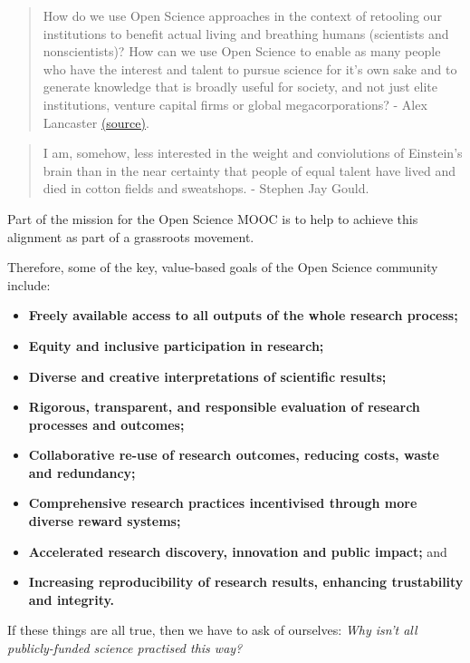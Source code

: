 \documentclass[]{book}
\begin{document}
{{\begin{quote}
How do we use Open Science approaches in the context of retooling our institutions to benefit actual living and breathing humans (scientists and nonscientists)? How can we use Open Science to enable as many people who have the interest and talent to pursue science for it's own sake and to generate knowledge that is broadly useful for society, and not just elite institutions, venture capital firms or global megacorporations? - Alex Lancaster \href{http://ronininstitute.org/open-science-and-its-discontents/}{(source)}.
\end{quote}

\begin{quote}
I am, somehow, less interested in the weight and conviolutions of Einstein's brain than in the near certainty that people of equal talent have lived and died in cotton fields and sweatshops. - Stephen Jay Gould.
\end{quote}

Part of the mission for the Open Science MOOC is to help to achieve this alignment as part of a grassroots movement.

Therefore, some of the key, value-based goals of the Open Science community include:

\begin{itemize}
\item
  \textbf{Freely available access to all outputs of the whole research process;}
\item
  \textbf{Equity and inclusive participation in research;}
\item
  \textbf{Diverse and creative interpretations of scientific results;}
\item
  \textbf{Rigorous, transparent, and responsible evaluation of research processes and outcomes;}
\item
  \textbf{Collaborative re-use of research outcomes, reducing costs, waste and redundancy;}
\item
  \textbf{Comprehensive research practices incentivised through more diverse reward systems;}
\item
  \textbf{Accelerated research discovery, innovation and public impact;} and
\item
  \textbf{Increasing reproducibility of research results, enhancing trustability and integrity.}
\end{itemize}

If these things are all true, then we have to ask of ourselves: \emph{Why isn't all publicly-funded science practised this way?}

}}
\end{document}
